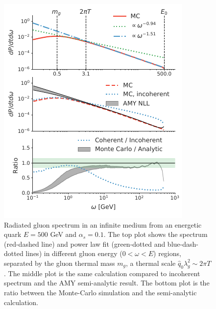 \documentclass[aps, prc, reprint, amsmath, groupedaddress, nofootinbib]{revtex4-1}
\begin{document}
\begin{figure}
\includegraphics[width=\columnwidth]{spectrum.pdf}
\caption{Radiated gluon spectrum in an infinite medium from an energetic quark $E=500$ GeV and $\alpha_s = 0.1$. The top plot shows the spectrum (red-dashed line) and power law fit (green-dotted and blue-dash-dotted lines) in different gluon energy ($0<\omega < E$) regions, separated by the gluon thermal mass $m_g$, a thermal scale $\hat{q}_0\lambda_g^2 \sim 2\pi T$. The middle plot is the same calculation compared to incoherent spectrum and the AMY semi-analytic result. The bottom plot is the ratio between the Monte-Carlo simulation and the semi-analytic calculation.}
\label{fig:spectrum}
\end{figure}
\end{document}
